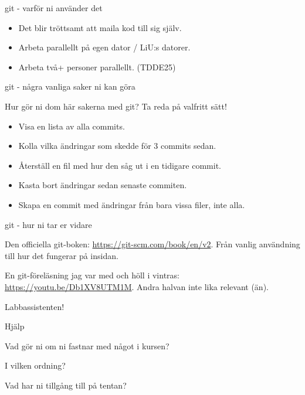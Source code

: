 \documentclass{beamer}
\begin{document}
  \begin{frame}{git - varför ni använder det}

    \pause{}

    \begin{itemize}[<+->]
      \item Det blir tröttsamt att maila kod till sig själv.
      \item Arbeta parallellt på egen dator / LiU:s datorer.
      \item Arbeta två+ personer parallellt. (TDDE25)
    \end{itemize}

  \end{frame}

  \begin{frame}{git - några vanliga saker ni kan göra}

    Hur gör ni dom här sakerna med git? Ta reda på valfritt sätt!

    \begin{itemize}
      \item Visa en lista av alla commits.
      \item Kolla vilka ändringar som skedde för 3 commits sedan.
      \item Återställ en fil med hur den såg ut i en tidigare commit.
      \item Kasta bort ändringar sedan senaste commiten.
      \item Skapa en commit med ändringar från bara vissa filer, inte alla.
    \end{itemize}
  \end{frame}

  \begin{frame}{git - hur ni tar er vidare}

    Den officiella git-boken: \url{https://git-scm.com/book/en/v2}. Från vanlig
    användning till hur det fungerar på insidan.

    \pause{}

    En git-föreläsning jag var med och höll i vintras:
    \url{https://youtu.be/Db1XV8UTM1M}. Andra halvan inte lika relevant (än).

    \pause{}

    Labbassistenten!

  \end{frame}

  \begin{frame}{Hjälp}

    Vad gör ni om ni fastnar med något i kursen?

    I vilken ordning?

    \pause{}

    Vad har ni tillgång till på tentan?

  \end{frame}
\end{document}
